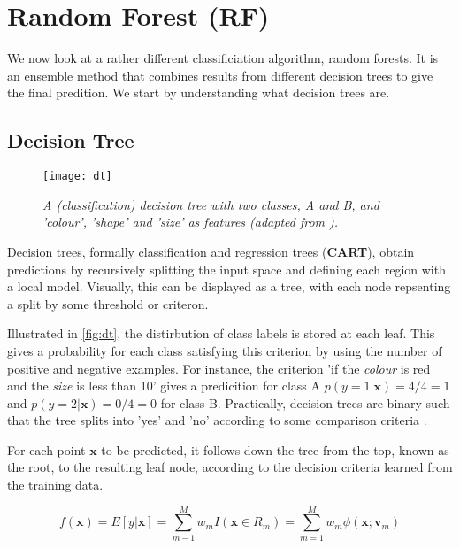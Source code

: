 \newpage
\section{Random Forest (RF)}

We now look at a rather different classificiation algorithm, random forests. It is an ensemble method that combines results from different decision trees to give the final predition. We start by understanding what decision trees are.

\subsection{Decision Tree}
\begin{figure}[H]
  \centering
  \texttt{[image: dt]}
  \caption{\textit{A (classification) decision tree with two classes, A and B,  and 'colour', 'shape' and 'size' as features (adapted from \protect{}).}}
  \label{fig:dt}
\end{figure}

Decision trees, formally classification and regression trees (\textbf{CART}), obtain predictions by recursively splitting the input space and defining each region with a local model. Visually, this can be displayed as a tree, with each node repsenting a split by some threshold or criteron. 

Illustrated in \autoref{fig:dt}, the distirbution of class labels is stored at each leaf. This gives a probability for each class satisfying this criterion by using the number of positive and negative examples. For instance, the criterion 'if the \textit{colour} is red and the \textit{size} is less than 10' gives a predicition for class A $p(y=1|\mathbf{x}) = 4/4 = 1$ and $p(y=2|\mathbf{x}) = 0/4 = 0$ for class B. Practically, decision trees are binary such that the tree splits into 'yes' and 'no' according to some comparison criteria \cite{mur-book}.

For each point $\mathbf{x}$ to be predicted, it follows down the tree from the top, known as the root, to the resulting leaf node, according to the decision criteria learned from the training data.

\begin{equation} \label{eq:dt}
  f(\mathbf{x}) = E[y|\mathbf{x}] = \sum_{m-1}^{M} w_m I(\mathbf{x} \in R_m)
                                  = \sum_{m=1}^{M} w_m \phi(\mathbf{x}; \mathbf{v}_m)
\end{equation}

